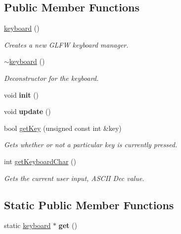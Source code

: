 \subsection*{Public Member Functions}
\begin{DoxyCompactItemize}
\item 
\hyperlink{classflounder_1_1keyboard_a2545f195eb7f57530cdc9056f641702c}{keyboard} ()
\begin{DoxyCompactList}\small\item\em Creates a new G\+L\+FW keyboard manager. \end{DoxyCompactList}\item 
\hyperlink{classflounder_1_1keyboard_a7af3194a3ee06eb4e58b9a9adf5a6e52}{$\sim$keyboard} ()
\begin{DoxyCompactList}\small\item\em Deconstructor for the keyboard. \end{DoxyCompactList}\item 
\mbox{\label{classflounder_1_1keyboard_a3d9ab826717b006314448da06ca24bf5}} 
void {\bfseries init} ()
\item 
\mbox{\label{classflounder_1_1keyboard_a6acbbf73165839182d1cbb868c71708e}} 
void {\bfseries update} ()
\item 
bool \hyperlink{classflounder_1_1keyboard_a26448bc1e44c9bfa9af882d53e599721}{get\+Key} (unsigned const int \&key)
\begin{DoxyCompactList}\small\item\em Gets whether or not a particular key is currently pressed. \end{DoxyCompactList}\item 
int \hyperlink{classflounder_1_1keyboard_ad941be3ae52b1c60437695d8faf1b6d7}{get\+Keyboard\+Char} ()
\begin{DoxyCompactList}\small\item\em Gets the current user input, A\+S\+C\+II Dec value. \end{DoxyCompactList}\end{DoxyCompactItemize}
\subsection*{Static Public Member Functions}
\begin{DoxyCompactItemize}
\item 
\mbox{\label{classflounder_1_1keyboard_a7493bf7e18bf4b5fc7679a3e8b10ec27}} 
static \hyperlink{classflounder_1_1keyboard}{keyboard} $\ast$ {\bfseries get} ()
\end{DoxyCompactItemize}
